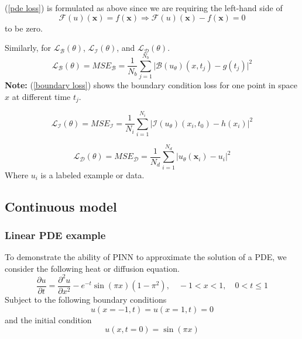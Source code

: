 \documentclass[a4paper,12pt]{article}
\theoremstyle{definition}
\begin{document}
(\ref{pde loss}) is formulated as above since we are requiring the left-hand side of 
$$
\mathcal{F}(u)(\mathbf{x}) = f(\mathbf{x})  \Rightarrow 
\mathcal{F}(u)(\mathbf{x}) - f(\mathbf{x}) = 0
$$
to be zero.

Similarly, for $\mathcal{L}_{\mathcal{B}}(\theta)$,  $\mathcal{L}_{\mathcal{I}}(\theta)$, and 
$\mathcal{L}_{\mathcal{D}}(\theta)$.
\begin{equation}\label{boundary loss}
\mathcal{L}_{\mathcal{B}}(\theta) = MSE_{\mathcal{B}} 
= \frac{1}{N_b} \sum_{j=1}^{N_b} \bigg| \mathcal{B}(u_\theta)(x, t_j) - g(t_j) \bigg|^2
\end{equation}
\textbf{Note:} (\ref{boundary loss}) shows the boundary condition loss for one point in space $x$ 
at different time $t_j$. 

\begin{equation}
\mathcal{L}_{\mathcal{I}}(\theta) = MSE_{\mathcal{I}} 
= \frac{1}{N_i} \sum_{i=1}^{N_i} \bigg| \mathcal{I}(u_\theta)(x_i, t_0) - h(x_i) \bigg|^2
\end{equation}

\begin{equation}
\mathcal{L}_{\mathcal{D}}(\theta) = MSE_{\mathcal{D}} 
= \frac{1}{N_d} \sum_{i=1}^{N_d} \bigg| u_{\theta}(\mathbf{x}_i) - u_i \bigg|^2
\end{equation}
Where $u_i$ is a labeled example or data.

\subsection{Continuous model}
\subsubsection{Linear PDE example}
To demonstrate the ability of PINN to approximate the solution of a PDE, we 
consider the following heat or diffusion equation.
\begin{equation}
\frac{\partial u}{\partial t} = \frac{\partial^2 u}{\partial x^2}
- e^{-t} \sin{(\pi x)} (1 - \pi^2), \quad -1 < x < 1, \quad 0 < t \le 1
\end{equation} 
Subject to the following boundary conditions
\begin{equation}
    u(x=-1, t) = u(x=1, t) = 0
\end{equation}
and the initial condition
\begin{equation}
u(x, t=0) = \sin(\pi x)
\end{equation}
\end{document}
